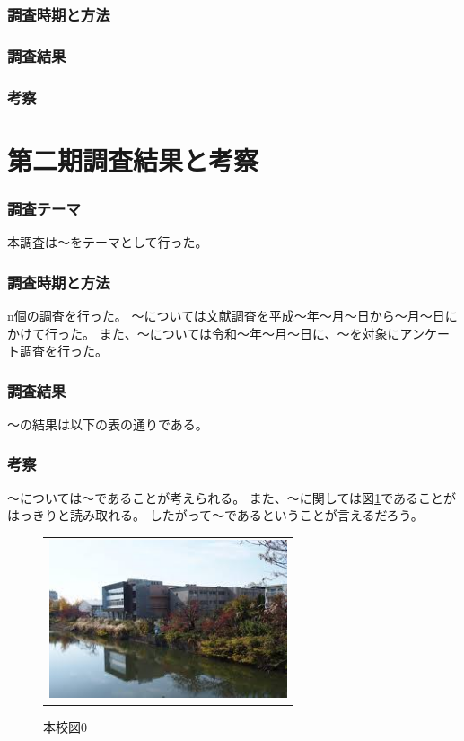 \documentclass[twocolumn]{jsarticle}
\begin{document}
\section{調査時期と方法}


\section{調査結果}


\section{考察}


\part{第二期調査結果と考察}
\section{調査テーマ}
本調査は〜をテーマとして行った。

\section{調査時期と方法}
n個の調査を行った。
〜については文献調査を平成〜年〜月〜日から〜月〜日にかけて行った。
また、〜については令和〜年〜月〜日に、〜を対象にアンケート調査を行った。

\section{調査結果}
〜の結果は以下の表の通りである。


\section{考察}
〜については〜であることが考えられる。
また、〜に関しては図\ref{fig:school0}であることがはっきりと読み取れる。
したがって〜であるということが言えるだろう。

\begin{figure}[h]
  \begin{tabular}{c}
     \begin{minipage}[t]{1\hsize}
       \begin{center}
         \includegraphics[clip,width=70mm,angle=0]{images/honko.jpg}
         \caption{本校図0}
         \label{fig:school0}
       \end{center}
     \end{minipage}
  \end{tabular}
\end{figure}
\end{document}
